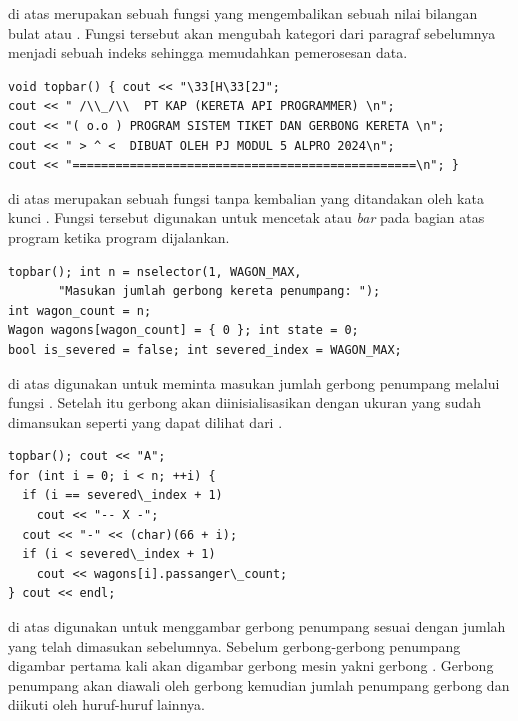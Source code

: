 \documentclass[../main.tex]{subfiles}
\begin{document}
{\Script} di atas merupakan sebuah fungsi yang mengembalikan sebuah nilai bilangan bulat atau . Fungsi tersebut akan mengubah kategori dari paragraf sebelumnya menjadi sebuah indeks sehingga memudahkan pemerosesan data.

\begin{code}
\begin{verbatim}
void topbar() { cout << "\33[H\33[2J";
cout << " /\\_/\\  PT KAP (KERETA API PROGRAMMER) \n";
cout << "( o.o ) PROGRAM SISTEM TIKET DAN GERBONG KERETA \n";
cout << " > ^ <  DIBUAT OLEH PJ MODUL 5 ALPRO 2024\n";
cout << "================================================\n"; }
\end{verbatim}
\end{code}

{\Script} di atas merupakan sebuah fungsi tanpa kembalian yang ditandakan oleh kata kunci . Fungsi tersebut digunakan untuk mencetak {\header} atau \textit{bar} pada bagian atas program ketika program dijalankan.

\begin{code}
\begin{verbatim}
topbar(); int n = nselector(1, WAGON_MAX,
       "Masukan jumlah gerbong kereta penumpang: ");
int wagon_count = n;
Wagon wagons[wagon_count] = { 0 }; int state = 0;
bool is_severed = false; int severed_index = WAGON_MAX;
\end{verbatim}
\end{code}

{\Script} di atas digunakan untuk meminta masukan jumlah gerbong penumpang melalui fungsi . Setelah itu gerbong akan diinisialisasikan dengan ukuran yang sudah dimansukan seperti yang dapat dilihat dari {\statement} .

\begin{code}
\begin{verbatim}
topbar(); cout << "A";
for (int i = 0; i < n; ++i) {
  if (i == severed\_index + 1)
    cout << "-- X -";
  cout << "-" << (char)(66 + i);
  if (i < severed\_index + 1)
    cout << wagons[i].passanger\_count;
} cout << endl;
\end{verbatim}
\end{code}

{\Script} di atas digunakan untuk menggambar gerbong penumpang sesuai dengan jumlah yang telah dimasukan sebelumnya. Sebelum gerbong-gerbong penumpang digambar pertama kali akan digambar gerbong mesin yakni gerbong . Gerbong penumpang akan diawali oleh gerbong  kemudian jumlah penumpang gerbong dan diikuti oleh huruf-huruf lainnya.
\end{document}
